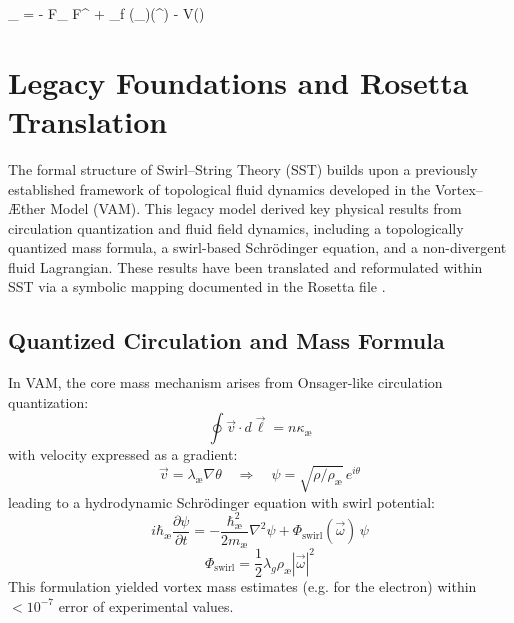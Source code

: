 \documentclass[reprint,aps,onecolumn,nofootinbib]{revtex4-2}
\begin{document}
        _ = - F_{\mu\nu} F^{\mu\nu} + \rho_f (\partial_\mu \phi)(\partial^\mu \phi) - V(\phi)

    \section{Legacy Foundations and Rosetta Translation}
    \label{sec:legacy-rosetta}

        The formal structure of Swirl–String Theory (SST) builds upon a previously established framework of topological fluid dynamics developed in the Vortex–Æther Model (VAM). This legacy model derived key physical results from circulation quantization and fluid field dynamics, including a topologically quantized mass formula, a swirl-based Schrödinger equation, and a non-divergent fluid Lagrangian. These results have been translated and reformulated within SST via a symbolic mapping documented in the Rosetta file \cite{vamrosetta2025}.

    \subsection{Quantized Circulation and Mass Formula}

        In VAM, the core mass mechanism arises from Onsager-like circulation quantization:
        \begin{equation}
        \oint \vec{v} \cdot d\vec{\ell} = n \kappa_\text{æ}
        \end{equation}
        with velocity expressed as a gradient:
        \begin{equation}
        \vec{v} = \lambda_\text{æ} \nabla \theta \quad \Rightarrow \quad \psi = \sqrt{\rho/\rho_\text{æ}}\, e^{i\theta}
        \end{equation}
        leading to a hydrodynamic Schrödinger equation with swirl potential:
        \begin{equation}
        i\hbar_\text{æ} \frac{\partial \psi}{\partial t} = -\frac{\hbar_\text{æ}^2}{2m_\text{æ}} \nabla^2 \psi + \Phi_{\text{swirl}}(\vec{\omega})\, \psi
        \end{equation}
        \begin{equation}
        \Phi_{\text{swirl}} = \frac{1}{2} \lambda_g \rho_\text{æ} |\vec{\omega}|^2
        \end{equation}
        This formulation yielded vortex mass estimates (e.g. for the electron) within \( <10^{-7} \) error of experimental values.
\end{document}
